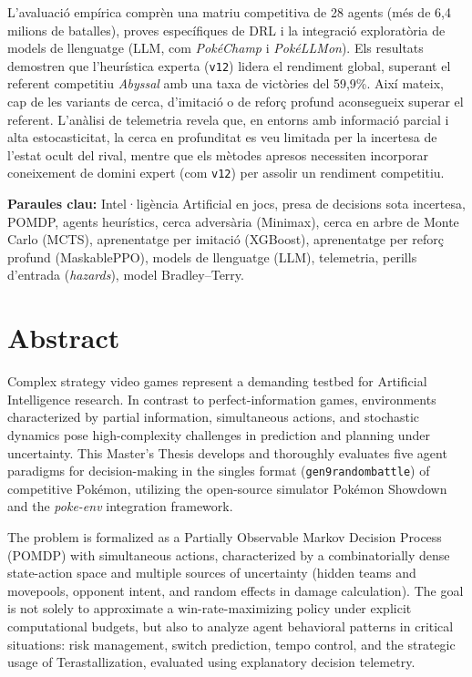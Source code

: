 L'avaluació empírica comprèn una matriu competitiva de 28 agents (més de 6,4 milions de batalles), proves específiques de DRL i la integració exploratòria de models de llenguatge (LLM, com \textit{PokéChamp} i \textit{PokéLLMon}). Els resultats demostren que l'heurística experta (\texttt{v12}) lidera el rendiment global, superant el referent competitiu \textit{Abyssal} amb una taxa de victòries del 59,9\%. Així mateix, cap de les variants de cerca, d'imitació o de reforç profund aconsegueix superar el referent. L'anàlisi de telemetria revela que, en entorns amb informació parcial i alta estocasticitat, la cerca en profunditat es veu limitada per la incertesa de l'estat ocult del rival, mentre que els mètodes apresos necessiten incorporar coneixement de domini expert (com \texttt{v12}) per assolir un rendiment competitiu.

\vspace{0.5cm}
\noindent\textbf{Paraules clau:} Intel·ligència Artificial en jocs, presa de decisions sota incertesa, POMDP, agents heurístics, cerca adversària (Minimax), cerca en arbre de Monte Carlo (MCTS), aprenentatge per imitació (XGBoost), aprenentatge per reforç profund (MaskablePPO), models de llenguatge (LLM), telemetria, perills d'entrada (\emph{hazards}), model Bradley--Terry.

\clearpage

\chapter*{Abstract}
Complex strategy video games represent a demanding testbed for Artificial Intelligence research. In contrast to perfect-information games, environments characterized by partial information, simultaneous actions, and stochastic dynamics pose high-complexity challenges in prediction and planning under uncertainty. This Master's Thesis develops and thoroughly evaluates five agent paradigms for decision-making in the singles format (\texttt{gen9randombattle}) of competitive Pokémon, utilizing the open-source simulator Pokémon Showdown and the \textit{poke-env} integration framework.

The problem is formalized as a Partially Observable Markov Decision Process (POMDP) with simultaneous actions, characterized by a combinatorially dense state-action space and multiple sources of uncertainty (hidden teams and movepools, opponent intent, and random effects in damage calculation). The goal is not solely to approximate a win-rate-maximizing policy under explicit computational budgets, but also to analyze agent behavioral patterns in critical situations: risk management, switch prediction, tempo control, and the strategic usage of Terastallization, evaluated using explanatory decision telemetry.

